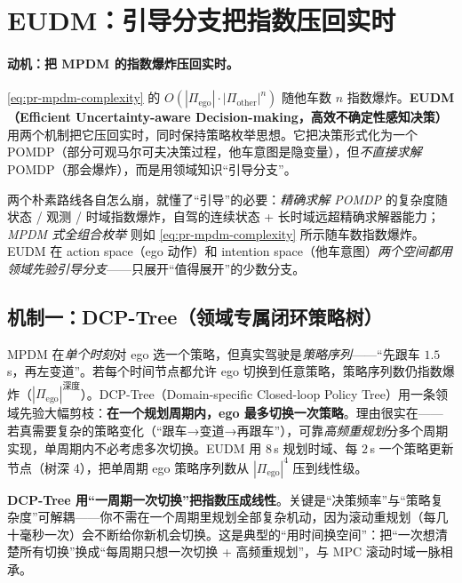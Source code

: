 \section{EUDM：引导分支把指数压回实时}
\label{sec:pr-eudm}

\paragraph{动机：把 MPDM 的指数爆炸压回实时。}
\cref{eq:pr-mpdm-complexity} 的 $O(|\Pi_{\mathrm{ego}}|\cdot|\Pi_{\mathrm{other}}|^n)$ 随他车数 $n$ 指数爆炸。\textbf{EUDM（Efficient Uncertainty-aware Decision-making，高效不确定性感知决策）}\cite{zhang2020eudm} 用两个机制把它压回实时，同时保持策略枚举思想。它把决策形式化为一个 POMDP（部分可观马尔可夫决策过程，他车意图是隐变量），但\emph{不直接求解} POMDP（那会爆炸），而是用领域知识“引导分支”。

两个朴素路线各自怎么崩，就懂了“引导”的必要：\emph{精确求解 POMDP} 的复杂度随状态 / 观测 / 时域指数爆炸，自驾的连续状态 + 长时域远超精确求解器能力；\emph{MPDM 式全组合枚举} 则如 \cref{eq:pr-mpdm-complexity} 所示随车数指数爆炸。EUDM 在 action space（ego 动作）和 intention space（他车意图）\emph{两个空间都用领域先验引导分支}——只展开“值得展开”的少数分支。

\subsection{机制一：DCP-Tree（领域专属闭环策略树）}
\label{sec:pr-eudm-dcp}

MPDM 在\emph{单个时刻}对 ego 选一个策略，但真实驾驶是\emph{策略序列}——“先跟车 $1.5\,$s，再左变道”。若每个时间节点都允许 ego 切换到任意策略，策略序列数仍指数爆炸（$|\Pi_{\mathrm{ego}}|^{\text{深度}}$）。DCP-Tree（Domain-specific Closed-loop Policy Tree）用一条领域先验大幅剪枝：\textbf{在一个规划周期内，ego 最多切换一次策略}\cite{zhang2020eudm}。理由很实在——若真需要复杂的策略变化（“跟车→变道→再跟车”），可靠\emph{高频重规划}分多个周期实现，单周期内不必考虑多次切换。EUDM 用 $8\,$s 规划时域、每 $2\,$s 一个策略更新节点（树深 4），把单周期 ego 策略序列数从 $|\Pi_{\mathrm{ego}}|^4$ 压到线性级。

\begin{insight}
\textbf{DCP-Tree 用“一周期一次切换”把指数压成线性}。关键是“决策频率”与“策略复杂度”可解耦——你不需在一个周期里规划全部复杂机动，因为滚动重规划（每几十毫秒一次）会不断给你新机会切换。这是典型的“用时间换空间”：把“一次想清楚所有切换”换成“每周期只想一次切换 + 高频重规划”，与 MPC 滚动时域一脉相承。
\end{insight}

